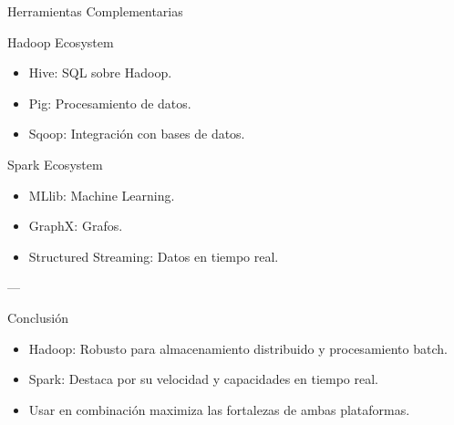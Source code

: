 \documentclass[presentation]{beamer}
\begin{document}
\begin{frame}[label={sec:org1238446}]{Herramientas Complementarias}
\begin{block}{Hadoop Ecosystem}
\begin{itemize}
\item \alert{\alert{Hive:}} SQL sobre Hadoop.
\item \alert{\alert{Pig:}} Procesamiento de datos.
\item \alert{\alert{Sqoop:}} Integración con bases de datos.
\end{itemize}
\end{block}

\begin{block}{Spark Ecosystem}
\begin{itemize}
\item \alert{\alert{MLlib:}} Machine Learning.
\item \alert{\alert{GraphX:}} Grafos.
\item \alert{\alert{Structured Streaming:}} Datos en tiempo real.
\end{itemize}

---
\end{block}
\end{frame}

\begin{frame}[label={sec:orgf606b0c}]{Conclusión}
\begin{itemize}
\item \alert{\alert{Hadoop:}} Robusto para almacenamiento distribuido y procesamiento batch.
\item \alert{\alert{Spark:}} Destaca por su velocidad y capacidades en tiempo real.
\item Usar en combinación maximiza las fortalezas de ambas plataformas.
\end{itemize}
\end{frame}
\end{document}
